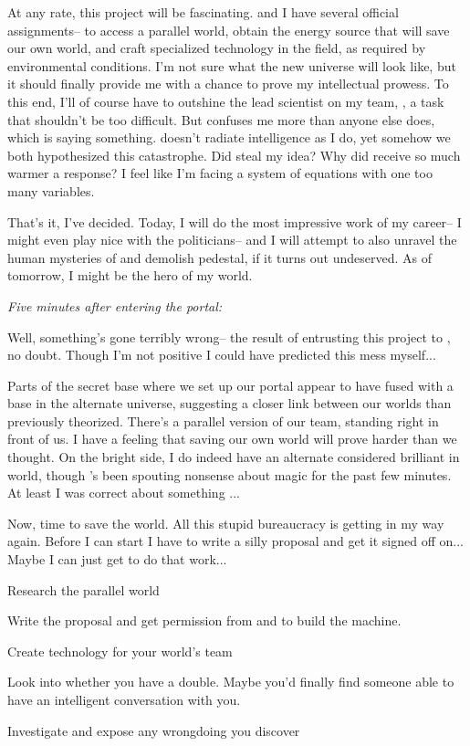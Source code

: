 \documentclass[char]{guildcamp3}
\begin{document}
At any rate, this project will be fascinating. \cSciOne{} and I have several official assignments-- to access a parallel world, obtain the energy source that will save our own world, and craft specialized technology in the field, as required by environmental conditions. I'm not sure what the new universe will look like, but it should finally provide me with a chance to prove my intellectual prowess. To this end, I'll of course have to outshine the lead scientist on my team, \cSciOne{}, a task that shouldn't be too difficult. But \cSciOne{\they} confuses me more than anyone else does, which is saying something. \cSciOne{\they} doesn't radiate intelligence as I do, yet somehow we both hypothesized this catastrophe. Did \cSciOne{\they} steal my idea? Why did \cSciOne{\they} receive so much warmer a response? I feel like I'm facing a system of equations with one too many variables.

That's it, I've decided. Today, I will do the most impressive work of my career-- I might even play nice with the politicians-- and I will attempt to also unravel the human mysteries of \cSciOne{} and demolish \cSciOne{\their} pedestal, if it turns out undeserved. As of tomorrow, I might be the hero of my world.

\emph{Five minutes after entering the portal:}


Well, something's gone terribly wrong-- the result of entrusting this project to \cSciOne{}, no doubt. Though I'm not positive I could have predicted this mess myself...

 Parts of the secret base where we set up our portal appear to have fused with a base in the alternate universe, suggesting a closer link between our worlds than previously theorized. There's a parallel version of our team, standing right in front of us. I have a feeling that saving our own world will prove harder than we thought.
On the bright side, I do indeed have an alternate considered brilliant in \cMageOne{\their} world, though \cMageOne{\they}'s been spouting nonsense about magic for the past few minutes. At least I was correct about something ...

Now, time to save the world. All this stupid bureaucracy is getting in my way again. Before I can start I have to write a silly proposal and get it signed off on... Maybe I can just get \cSciOne{} to do that work...

\begin{itemz}[Goals]
  \item Research the parallel world
  \item Write the proposal and get permission from \cPoliOne{} and \cPoliTwo{} to build the machine. 
  \item Create technology for your world's team
  \item Look into whether you have a double. Maybe you'd finally find someone able to have an intelligent conversation with you. 
  \item Investigate \cSciOne{} and expose any wrongdoing you discover
\end{itemz}
\end{document}

